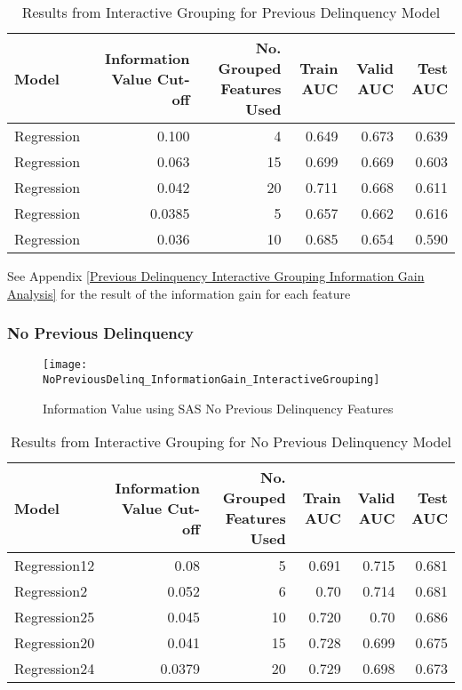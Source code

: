 \begin{table}[H]
	\centering
	\resizebox{\textwidth}{!}
	{
		\begin{tabular}{l | r | r | r | r| r}
			\hline
			\textbf{Model} & \textbf{Information Value Cut-off}& \textbf{No. Grouped Features Used} & \textbf{Train AUC} & \textbf{Valid AUC} &  \textbf{Test AUC} \\
			\hline
			Regression  & 0.100 & 4 &  0.649 &  0.673 &  0.639  \\
			Regression &  0.063 & 15 & 0.699 &  0.669 &  0.603  \\			
			Regression &  0.042 & 20 & 0.711 &  0.668 &  0.611  \\	
			Regression & 0.0385 & 5 &  0.657 &  0.662 &  0.616  \\	
			Regression & 0.036 & 10 &  0.685 &  0.654 &  0.590  \\		
			\hline
		\end{tabular}
	}
	\caption{Results from Interactive Grouping for Previous Delinquency Model}
	\label{table:InteractiveGroupingPreviousDelinquency}
\end{table}

See Appendix \ref{Previous Delinquency Interactive Grouping Information Gain Analysis} for the result of the information gain for each feature

\subsubsection{No Previous Delinquency}

\begin{figure}[H]
	\texttt{[image: NoPreviousDelinq\_InformationGain\_InteractiveGrouping]}
	\caption{Information Value using SAS No Previous Delinquency Features}
	\label{fig:Information Value using SAS No Previous Delinquency Features}
\end{figure}

\begin{table}[H]
	\centering
	\resizebox{\textwidth}{!}
	{
		\begin{tabular}{l | r | r | r | r| r}
			\hline
			\textbf{Model} & \textbf{Information Value Cut-off}& \textbf{No. Grouped Features Used} & \textbf{Train AUC} & \textbf{Valid AUC} &  \textbf{Test AUC} \\
			\hline
			Regression12  & 0.08 & 5 &  0.691 &  0.715 &  0.681  \\
			Regression2 &  0.052 & 6 & 0.70 &  0.714 &  0.681  \\			
			Regression25 &  0.045 & 10 & 0.720 &  0.70 &  0.686  \\	
			Regression20 & 0.041 & 15 &  0.728 &  0.699 &  0.675  \\	
			Regression24 & 0.0379 & 20 &  0.729 &  0.698 &  0.673 \\		
			\hline
		\end{tabular}
	}
	\caption{Results from Interactive Grouping for No Previous Delinquency Model}
	\label{table:NoInteractiveGroupingPreviousDelinquency}
\end{table}

